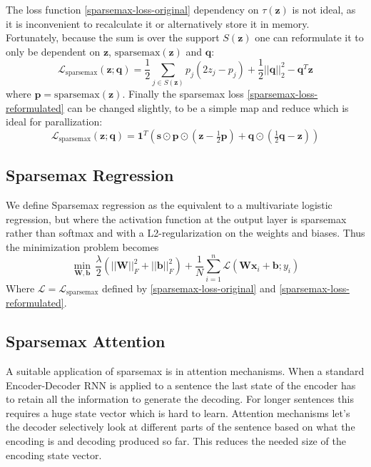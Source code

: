 The loss function \eqref{sparsemax-loss-original} dependency on $\tau(\mathbf{z})$ is not ideal, as it is inconvenient to recalculate it or alternatively store it in memory. Fortunately, because the sum is over the support $S(\mathbf{z})$ one can reformulate it to only be dependent on $\mathbf{z}$, $\mathrm{sparsemax}(\mathbf{z})$ and $\mathbf{q}$:
\begin{equation}
\mathcal{L}_{\mathrm{sparsemax}}(\mathbf{z}; \mathbf{q}) = \frac{1}{2} \sum_{j \in S(\mathbf{z})} p_j (2 z_j - p_j) + \frac{1}{2} ||\mathbf{q}||_2^2 - \mathbf{q}^T \mathbf{z}
\label{sparsemax-loss-reformulated}
\end{equation}
where $\mathbf{p} = \mathrm{sparsemax}(\mathbf{z})$. Finally the sparsemax loss \eqref{sparsemax-loss-reformulated} can be changed slightly, to be a simple map and reduce which is ideal for parallization: 
\begin{equation}
\mathcal{L}_{\mathrm{sparsemax}}(\mathbf{z}; \mathbf{q}) = \mathbf{1}^T \left( \mathbf{s} \odot \mathbf{p} \odot \left(\mathbf{z} - \tfrac{1}{2} \mathbf{p}\right) + \mathbf{q} \odot \left(\tfrac{1}{2} \mathbf{q} - \mathbf{z}\right)\right)
\end{equation}

\subsection{Sparsemax Regression}
We define Sparsemax regression as the equivalent to a multivariate logistic regression, but where the activation function at the output layer is sparsemax rather than softmax and with a L2-regularization on the weights and biases. Thus the minimization problem becomes
\begin{equation}
\min_{\mathbf{W},\mathbf{b}} \, \frac{\lambda}{2} (||\mathbf{W}||^2_{F} + ||\mathbf{b}||^2_{F}) + \frac{1}{N} \sum\limits_{i=1}^n \mathcal{L} (\mathbf{W} \mathbf{x}_i + \mathbf{b}; y_i)
\label{sparsemax-regression}
\end{equation}
Where $\mathcal{L} = \mathcal{L}_{\mathrm{sparsemax}}$ defined by \eqref{sparsemax-loss-original} and \eqref{sparsemax-loss-reformulated}.

\subsection{Sparsemax Attention}
A suitable application of sparsemax is in attention mechanisms. When a standard Encoder-Decoder RNN is applied to a sentence the last state of the encoder has to retain all the information to generate the decoding. For longer sentences this requires a huge state vector which is hard to learn. Attention mechanisms let's the decoder selectively look at different parts of the sentence based on what the encoding is and decoding produced so far. This reduces the needed size of the encoding state vector.


